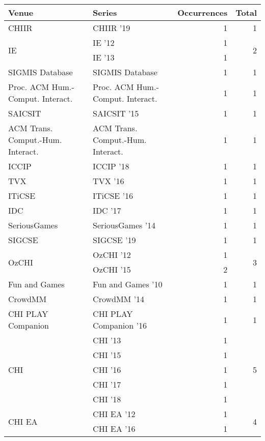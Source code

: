 \begin{table*}[t]
\begin{tabular}{llrr}
Venue & Series & Occurrences & Total\\\hline
\multirow{1}{*}{CHIIR } & CHIIR '19 & 1 & \multirow{1}{*}{1}\\
\multirow{2}{*}{IE } & IE '12 & 1 & \multirow{2}{*}{2}\\
& IE '13 & 1 &\\
\multirow{1}{*}{SIGMIS Database} & SIGMIS Database & 1 & \multirow{1}{*}{1}\\
\multirow{1}{*}{Proc. ACM Hum.-Comput. Interact.} & Proc. ACM Hum.-Comput. Interact. & 1 & \multirow{1}{*}{1}\\
\multirow{1}{*}{SAICSIT } & SAICSIT '15 & 1 & \multirow{1}{*}{1}\\
\multirow{1}{*}{ACM Trans. Comput.-Hum. Interact.} & ACM Trans. Comput.-Hum. Interact. & 1 & \multirow{1}{*}{1}\\
\multirow{1}{*}{ICCIP } & ICCIP '18 & 1 & \multirow{1}{*}{1}\\
\multirow{1}{*}{TVX } & TVX '16 & 1 & \multirow{1}{*}{1}\\
\multirow{1}{*}{ITiCSE } & ITiCSE '16 & 1 & \multirow{1}{*}{1}\\
\multirow{1}{*}{IDC } & IDC '17 & 1 & \multirow{1}{*}{1}\\
\multirow{1}{*}{SeriousGames } & SeriousGames '14 & 1 & \multirow{1}{*}{1}\\
\multirow{1}{*}{SIGCSE } & SIGCSE '19 & 1 & \multirow{1}{*}{1}\\
\multirow{2}{*}{OzCHI } & OzCHI '12 & 1 & \multirow{2}{*}{3}\\
& OzCHI '15 & 2 &\\
\multirow{1}{*}{Fun and Games } & Fun and Games '10 & 1 & \multirow{1}{*}{1}\\
\multirow{1}{*}{CrowdMM } & CrowdMM '14 & 1 & \multirow{1}{*}{1}\\
\multirow{1}{*}{CHI PLAY Companion } & CHI PLAY Companion '16 & 1 & \multirow{1}{*}{1}\\
\multirow{5}{*}{CHI } & CHI '13 & 1 & \multirow{5}{*}{5}\\
& CHI '15 & 1 &\\
& CHI '16 & 1 &\\
& CHI '17 & 1 &\\
& CHI '18 & 1 &\\
\multirow{3}{*}{CHI EA } & CHI EA '12 & 1 & \multirow{3}{*}{4}\\
& CHI EA '16 & 1 &\\

\end{tabular}
\end{table*}

